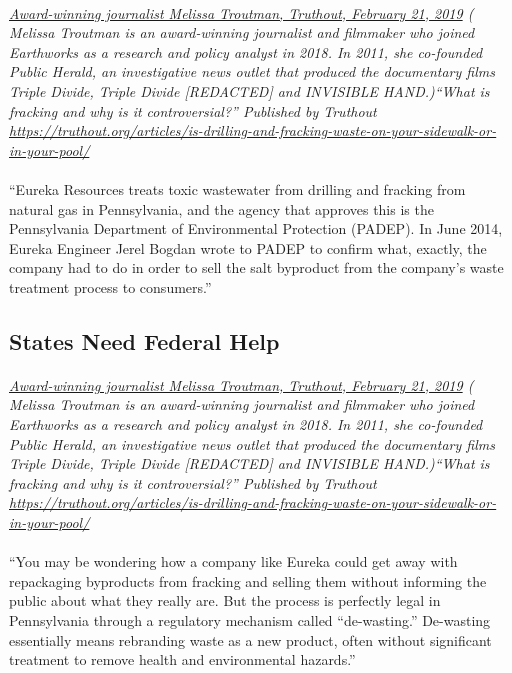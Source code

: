\documentclass{article}
\begin{document}
\paragraph{}
\small
\textit{
\underline{Award-winning journalist Melissa Troutman, Truthout, February 21, 2019}
( Melissa Troutman is an award-winning journalist and filmmaker who joined Earthworks as a research and policy analyst in 2018. In 2011, she co-founded Public Herald, an investigative news outlet that produced the documentary films Triple Divide, Triple Divide [REDACTED] and INVISIBLE HAND.)``What is fracking and why is it controversial?'' Published by Truthout
\url{https://truthout.org/articles/is-drilling-and-fracking-waste-on-your-sidewalk-or-in-your-pool/}}
\normalsize
\paragraph{}
``Eureka Resources treats toxic wastewater from drilling and fracking from natural gas in Pennsylvania, and the agency that approves this is the Pennsylvania Department of Environmental Protection (PADEP). In June 2014, Eureka Engineer Jerel Bogdan wrote to PADEP to confirm what, exactly, the company had to do in order to sell the salt byproduct from the company’s waste treatment process to consumers.”

\subsection{States Need Federal Help}
\paragraph{}
\small
\textit{
\underline{Award-winning journalist Melissa Troutman, Truthout, February 21, 2019}
( Melissa Troutman is an award-winning journalist and filmmaker who joined Earthworks as a research and policy analyst in 2018. In 2011, she co-founded Public Herald, an investigative news outlet that produced the documentary films Triple Divide, Triple Divide [REDACTED] and INVISIBLE HAND.)``What is fracking and why is it controversial?'' Published by Truthout
\url{https://truthout.org/articles/is-drilling-and-fracking-waste-on-your-sidewalk-or-in-your-pool/}}
\normalsize
\paragraph{}
``You may be wondering how a company like Eureka could get away with repackaging byproducts from fracking and selling them without informing the public about what they really are. But the process is perfectly legal in Pennsylvania through a regulatory mechanism called “de-wasting.” De-wasting essentially means rebranding waste as a new product, often without significant treatment to remove health and environmental hazards.”
\end{document}
